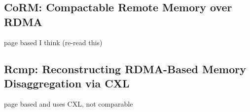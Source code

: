 \documentclass[sigplan,nonacm]{acmart}
\begin{document}
    \subsection{CoRM: Compactable Remote Memory over RDMA}
    page based I think (re-read this)\cite{Taranov-ICMD-2021}

    \subsection{Rcmp: Reconstructing RDMA-Based Memory Disaggregation via CXL}
    page based and uses CXL, not comparable\cite{Wang-ACO-2024}




\end{document}

